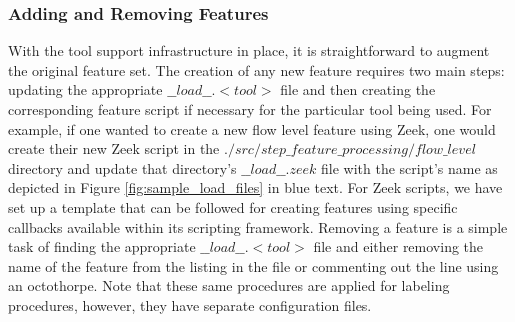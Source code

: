 \documentclass[sigconf, anonymous, screen, review]{acmart}
\begin{document}
\subsubsection{Adding and Removing Features}\label{subsubsec:adding_removing_features}
With the tool support infrastructure in place, it is straightforward to augment the original feature set.
The creation of any new feature requires two main steps:  updating the appropriate $\_\_load\_\_.<tool>$ file and then creating the corresponding feature script if necessary for the particular tool being used.
For example, if one wanted to create a new flow level feature using Zeek, one would create their new Zeek script in the $./src/step\_feature\_processing/flow\_level$ directory and update that directory's $\_\_load\_\_.zeek$ file with the script's name as depicted in Figure \ref{fig:sample_load_files} in blue text.
For Zeek scripts, we have set up a template that can be followed for creating features using specific callbacks available within its scripting framework.
Removing a feature is a simple task of finding the appropriate $\_\_load\_\_.<tool>$ file and either removing the name of the feature from the listing in the file or commenting out the line using an octothorpe.
Note that these same procedures are applied for labeling procedures, however, they have separate configuration files.
\end{document}
